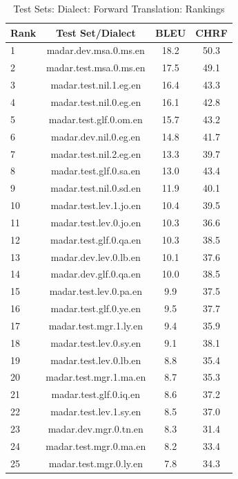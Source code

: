 \begin{table}[htbp]
\centering
\caption{Test Sets: Dialect: Forward Translation: Rankings}
\label{tab:testset_ranking_forward_dialect}
\begin{tabular}{l@{\hspace{3pt}}c@{\hspace{3pt}}c@{\hspace{3pt}}c}
\toprule
Rank & Test Set/Dialect & BLEU & CHRF \\
\midrule
1 & madar.dev.msa.0.ms.en & 18.2 & 50.3 \\
2 & madar.test.msa.0.ms.en & 17.5 & 49.1 \\
3 & madar.test.nil.1.eg.en & 16.4 & 43.3 \\
4 & madar.test.nil.0.eg.en & 16.1 & 42.8 \\
5 & madar.test.glf.0.om.en & 15.7 & 43.2 \\
6 & madar.dev.nil.0.eg.en & 14.8 & 41.7 \\
7 & madar.test.nil.2.eg.en & 13.3 & 39.7 \\
8 & madar.test.glf.0.sa.en & 13.0 & 43.4 \\
9 & madar.test.nil.0.sd.en & 11.9 & 40.1 \\
10 & madar.test.lev.1.jo.en & 10.4 & 39.5 \\
11 & madar.test.lev.0.jo.en & 10.3 & 36.6 \\
12 & madar.test.glf.0.qa.en & 10.3 & 38.5 \\
13 & madar.dev.lev.0.lb.en & 10.1 & 37.6 \\
14 & madar.dev.glf.0.qa.en & 10.0 & 38.5 \\
15 & madar.test.lev.0.pa.en & 9.9 & 37.5 \\
16 & madar.test.glf.0.ye.en & 9.5 & 37.7 \\
17 & madar.test.mgr.1.ly.en & 9.4 & 35.9 \\
18 & madar.test.lev.0.sy.en & 9.1 & 38.1 \\
19 & madar.test.lev.0.lb.en & 8.8 & 35.4 \\
20 & madar.test.mgr.1.ma.en & 8.7 & 35.3 \\
21 & madar.test.glf.0.iq.en & 8.6 & 37.2 \\
22 & madar.test.lev.1.sy.en & 8.5 & 37.0 \\
23 & madar.dev.mgr.0.tn.en & 8.3 & 31.4 \\
24 & madar.test.mgr.0.ma.en & 8.2 & 33.4 \\
25 & madar.test.mgr.0.ly.en & 7.8 & 34.3 \\

\end{tabular}
\end{table}
